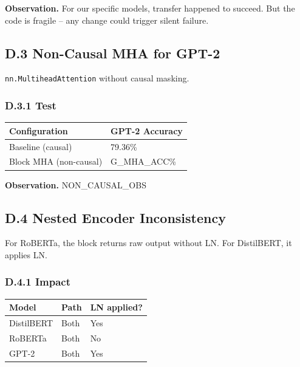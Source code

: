 \textbf{Observation.} For our specific models, transfer happened to succeed. But 
the code is fragile -- any change could trigger silent failure.

\subsection{D.3 Non-Causal MHA for GPT-2}

\texttt{nn.MultiheadAttention} without causal masking.

\subsubsection{D.3.1 Test}

\begin{table}[H]
\centering
\small
\begin{tabular}{ll}
\toprule
\textbf{Configuration} & \textbf{GPT-2 Accuracy} \\
\midrule
Baseline (causal) & 79.36\% \\
Block MHA (non-causal) & {{G\_MHA\_ACC}}\% \\
\bottomrule
\end{tabular}
\end{table}

\textbf{Observation.} {{NON\_CAUSAL\_OBS}}

\subsection{D.4 Nested Encoder Inconsistency}

For RoBERTa, the block returns raw output without LN. For DistilBERT, it 
applies LN.

\subsubsection{D.4.1 Impact}

\begin{table}[H]
\centering
\small
\begin{tabular}{lll}
\toprule
\textbf{Model} & \textbf{Path} & \textbf{LN applied?} \\
\midrule
DistilBERT & Both & Yes \\
RoBERTa & Both & No \\
GPT-2 & Both & Yes \\
\bottomrule
\end{tabular}
\end{table}

